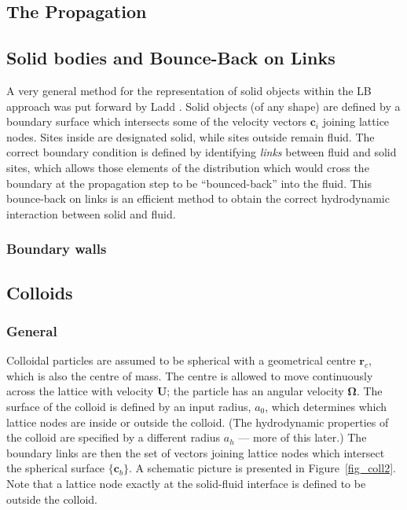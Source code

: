 \subsection{The Propagation}

\subsection{Solid bodies and Bounce-Back on Links}

A very general method for the representation of solid objects
within the LB approach was put forward by Ladd \cite{l94a, l94b}.
Solid objects (of any shape) are defined by a boundary surface
which intersects some of the velocity vectors $\mathbf{c}_i$
joining lattice nodes. Sites inside are designated solid, while
sites outside remain fluid. The correct boundary condition is
defined by identifying \textit{links} between fluid and solid
sites, which allows those elements of the distribution which would
cross the boundary at the propagation step to be ``bounced-back''
into the fluid. This bounce-back on links is an efficient method
to obtain the  correct hydrodynamic interaction between solid
and fluid.

\subsubsection{Boundary walls}



\subsection{Colloids}

\subsubsection{General}

Colloidal particles are assumed to be spherical with a geometrical
centre $\mathbf{r}_c$, which is also the centre of mass. The
centre is allowed to move continuously across the lattice
with velocity $\mathbf{U}$; the particle has an angular velocity
$\mathbf{\Omega}$. The surface of the colloid is defined by an
input radius, $a_0$, which determines which lattice nodes are
inside or outside the colloid. (The hydrodynamic properties of
the colloid are specified by a different radius $a_h$ --- more
of this later.) The boundary links are then the set of vectors
joining lattice nodes which intersect the spherical surface
$\{\mathbf{c}_b\}$. A schematic picture is presented in
Figure~\ref{fig_coll2}. Note that a lattice node exactly at
the solid-fluid interface is defined to be outside the colloid.


